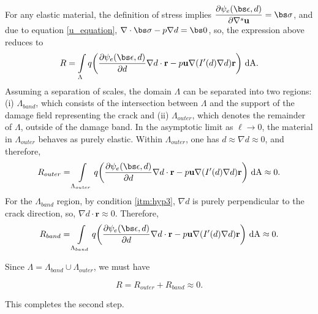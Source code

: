 \noindent For any elastic material, the definition of stress implies $\dfrac{\partial \psi_e(\bs\epsilon, d)}{\partial\nabla^s\textbf{u}} = \bs\sigma$, and due to equation \eqref{u_equation}, $\nabla \cdot \bs\sigma - p \nabla d = \bs 0$, so, the expression above reduces to
\begin{equation}
    R = \int\limits_{\Lambda} q\biggl(\dfrac{\partial \psi_e(\bs\epsilon, d)}{\partial d}\nabla d\cdot \textbf{r} 
    - p\textbf{u}\nabla(I'(d)\nabla d)\textbf{r} \biggr)\ \text{dA}.
\end{equation}
Assuming a separation of scales, the domain $\Lambda$ can be separated into two regions: (i) $\Lambda_{band}$, which consists of the intersection between $\Lambda$ and the support of the damage field representing the crack and (ii) $\Lambda_{outer}$, which denotes the remainder of $\Lambda$, outside of the damage band.  In the asymptotic limit as $\ell\rightarrow 0$, the material in $\Lambda_{outer}$ behaves as purely elastic. Within $\Lambda_{outer}$, one has $d \approx \nabla d \approx 0$, and therefore,  
\begin{equation}
    R_{outer}  = \int\limits_{\Lambda_{outer}} q\biggl(\dfrac{\partial \psi_e(\bs\epsilon, d)}{\partial d}\nabla d\cdot \textbf{r} - p\textbf{u}\nabla(I'(d)\nabla d)\textbf{r} \biggr)\ \text{dA} \approx 0.
\end{equation}
 For the $\Lambda_{band}$ region, by condition \ref{itm:hyp3}, $\nabla d$ is purely perpendicular to the crack direction, so, $\nabla d \cdot \textbf{r} \approx 0$. Therefore,
\begin{equation}
    R_{band} = \int\limits_{\Lambda_{band}} q\biggl(\dfrac{\partial \psi_e(\bs\epsilon, d)}{\partial d}\nabla d\cdot \textbf{r} 
    - p\textbf{u}\nabla(I'(d)\nabla d)\textbf{r} \biggr)\ \text{dA} \approx 0.
\end{equation}


\noindent Since $\Lambda = \Lambda_{band} \cup \Lambda_{outer}$, we must have 

\begin{equation}\label{step2}
    R = R_{outer}+R_{band} \approx 0.
\end{equation}

\noindent This completes the second step. 


